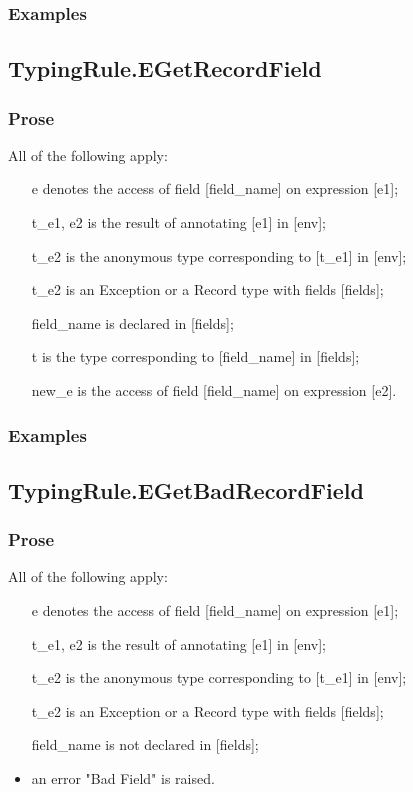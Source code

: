 \documentclass{book}
\begin{document}
  \subsubsection{Examples}

\subsection{TypingRule.EGetRecordField}

  \subsubsection{Prose}
  All of the following apply:
  \begin{itemize}
  \item  [e] denotes the access of field [field\_name] on expression [e1];
  \item  [t\_e1, e2] is the result of annotating [e1] in [env];
  \item  [t\_e2] is the anonymous type corresponding to [t\_e1] in [env];
  \item  [t\_e2] is an Exception or a Record type with fields [fields];
  \item  [field\_name] is declared in [fields];
  \item  [t] is the type corresponding to [field\_name] in [fields];
  \item  [new\_e] is the access of field [field\_name] on expression [e2].
  \end{itemize}

  \subsubsection{Examples}

\subsection{TypingRule.EGetBadRecordField}

  \subsubsection{Prose}
  All of the following apply:
  \begin{itemize}
  \item  [e] denotes the access of field [field\_name] on expression [e1];
  \item  [t\_e1, e2] is the result of annotating [e1] in [env];
  \item  [t\_e2] is the anonymous type corresponding to [t\_e1] in [env];
  \item  [t\_e2] is an Exception or a Record type with fields [fields];
  \item  [field\_name] is not declared in [fields];
  \item  an error "Bad Field" is raised.
  \end{itemize}
\end{document}
